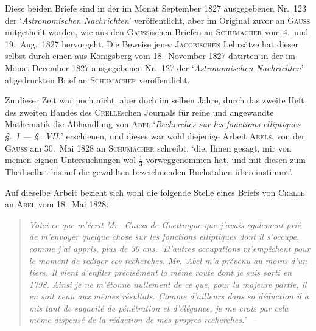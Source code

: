 \documentclass[12pt,a4paper]{article}
\begin{document}
Diese beiden Briefe sind in der im Monat September 1827 ausgegebenen Nr.\ 123 der `\textit{Astronomischen Nachrichten}' ver\"offentlicht, aber im Original zuvor an \textsc{Gau\ss} mitgetheilt worden, wie aus den
\textsc{Gau\ss}ischen Briefen an \textsc{Schumacher} vom 4.\ und 19.\ Aug.\ 1827 hervorgeht. Die Beweise jener \textsc{Jacobischen} Lehrs\"atze hat dieser selbst durch einen aus K\"onigsberg vom 18.\ November
1827 datirten in der im Monat December 1827 ausgegebenen Nr.\ 127 der `\textit{Astronomischen Nachrichten}' abgedruckten Brief an \textsc{Schumacher} ver\"offentlicht.

Zu dieser Zeit war noch nicht, aber doch im selben Jahre, durch das zweite Heft des zweiten Bandes
des \textsc{Crelle}schen Journals f\"ur reine und angewandte Mathematik die Abhandlung von \textsc{Abel}
`\textit{Recherches sur les fonctions elliptiques \S.\ I --- \S.\ VII.}' erschienen, und dieses war wohl diejenige Arbeit \textsc{Abels}, von der \textsc{Gau\ss} am 30.\ Mai 1828 an \textsc{Schumacher} schreibt, `die, Ihnen gesagt, mir von meinen eignen Untersuchungen wol $\tfrac{1}{3}$ vorweggenommen hat, und mit diesen zum Theil selbst bis auf die gew\"ahlten bezeichnenden Buchstaben \"ubereinstimmt'.

Auf dieselbe Arbeit bezieht sich wohl die folgende Stelle eines Briefs von \textsc{Crelle} an \textsc{Abel} vom
18.\ Mai 1828:

\begin{quote}
\textit{Voici ce que m'\'ecrit Mr.\ Gauss de Goettingue que j'avais egalement pri\'e de m'envoyer quelque chose sur les fonctions elliptiques dont il s'occupe, comme j'ai appris, plus de 30 ans. `D'autres occupations m'emp\^echent pour le moment de rediger ces recherches. Mr.\ Abel m'a pr\'evenu au moins d'un tiers. Il vient d'enfiler pr\'ecis\'ement la m\^eme route dont je suis sorti en 1798. Ainsi je ne m'\'etonne nullement de ce que, pour la majeure partie, il en soit venu aux m\^emes r\'esultats. Comme d'ailleurs dans sa d\'eduction il a mis tant de sagacit\'e de p\'en\'etration et d'\'el\'egance, je me crois par cela m\^eme dispens\'e de la r\'edaction de mes propres recherches.'} ---
\end{quote}

\newpage
\end{document}
